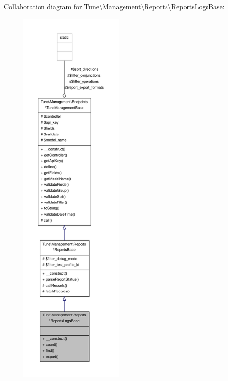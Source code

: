Collaboration diagram for Tune\textbackslash{}Management\textbackslash{}Reports\textbackslash{}Reports\-Logs\-Base\-:
\nopagebreak
\begin{figure}[H]
\begin{center}
\leavevmode
\includegraphics[height=550pt]{classTune_1_1Management_1_1Reports_1_1ReportsLogsBase__coll__graph}
\end{center}
\end{figure}
